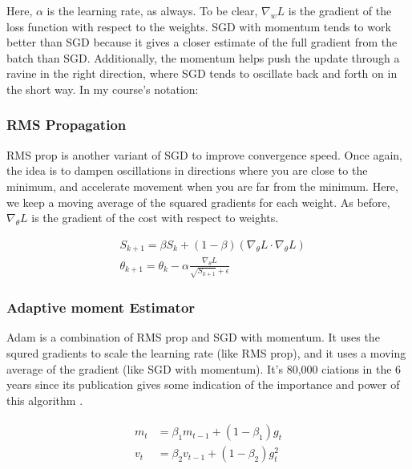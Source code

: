 Here, $ \alpha $  is the learning rate, as always. To be clear, $\nabla_w L$ is the gradient of the loss function with respect to the weights. SGD with momentum tends to work better than SGD because it gives a closer estimate of the full gradient from the batch than SGD. Additionally, the momentum helps push the update through a ravine in the right direction, where SGD tends to oscillate back and forth on in the short way. In my course's notation:

\subsubsection{RMS Propagation}
RMS prop is another variant of SGD to improve convergence speed. Once again, the idea is to dampen oscillations in directions where you are close to the minimum, and accelerate movement when you are far from the minimum. Here, we keep a moving average of the squared gradients for each weight. As before, $\nabla_\theta L$ is the gradient of the cost with respect to weights.

\begin{align}
    \label{eqn:RMS_Prop}
    & S_{k+1} = \beta S_k + (1 - \beta)(\nabla_\theta L \cdot \nabla_\theta L) \\
    & \theta_{k+1} = \theta_k - \alpha \frac{\nabla_\theta L}{\sqrt{S_{k+1}} + \epsilon}
\end{align}

\subsubsection{Adaptive moment Estimator}
Adam is a combination of RMS prop and SGD with momentum. It uses the squred gradients to scale the learning rate (like RMS prop), and it uses a moving average of the gradient (like SGD with momentum). It's 80,000 ciations in the 6 years since its publication gives some indication of the importance and power of this algorithm \cite{orig-ADAM-paper}.

\begin{align} 
    \begin{split} 
    m_t &= \beta_1 m_{t-1} + (1 - \beta_1) g_t \\ 
    v_t &= \beta_2 v_{t-1} + (1 - \beta_2) g_t^2 
    \end{split} 
\end{align}


